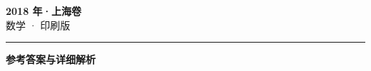 \documentclass[zihao=5, a4paper]{ctexart}
\begin{document}
\begin{center}
  {\Large\bfseries 2018 年·上海卷}\\[4pt]
  {\large 数学 · 印刷版}
\end{center}
\medskip
{}

\par\bigskip\hrule\bigskip
{}
\begin{center}{\large\bfseries 参考答案与详细解析}\end{center}
\smallskip

\end{document}
